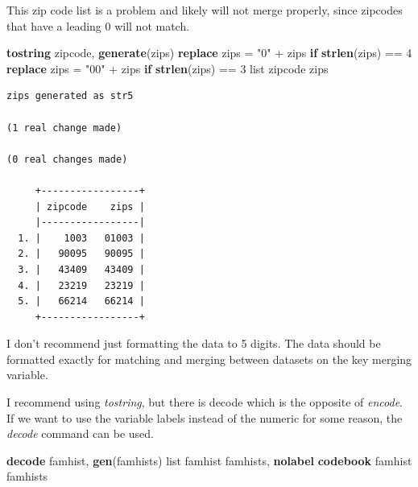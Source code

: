 \documentclass[
]{book}
\newenvironment{Shaded}{\begin{snugshade}}{\end{snugshade}}
\newcommand{\FunctionTok}[1]{\textcolor[rgb]{0.13,0.29,0.53}{\textbf{#1}}}
\newcommand{\KeywordTok}[1]{\textcolor[rgb]{0.13,0.29,0.53}{\textbf{#1}}}
\newcommand{\NormalTok}[1]{#1}
\newcommand{\OtherTok}[1]{\textcolor[rgb]{0.56,0.35,0.01}{#1}}
\newcommand{\StringTok}[1]{\textcolor[rgb]{0.31,0.60,0.02}{#1}}
\begin{document}
This zip code list is a problem and likely will not merge properly, since zipcodes that have a leading 0 will not match.

\begin{Shaded}
\begin{Highlighting}[]
\KeywordTok{tostring}\NormalTok{ zipcode, }\KeywordTok{generate}\NormalTok{(zips)}
\KeywordTok{replace}\NormalTok{ zips = }\StringTok{"0"}\NormalTok{ + zips }\KeywordTok{if} \FunctionTok{strlen}\NormalTok{(zips) == 4}
\KeywordTok{replace}\NormalTok{ zips = }\StringTok{"00"}\NormalTok{ + zips }\KeywordTok{if} \FunctionTok{strlen}\NormalTok{(zips) == 3}
\OtherTok{list}\NormalTok{ zipcode zips}
\end{Highlighting}
\end{Shaded}

\begin{verbatim}
zips generated as str5

(1 real change made)

(0 real changes made)

     +-----------------+
     | zipcode    zips |
     |-----------------|
  1. |    1003   01003 |
  2. |   90095   90095 |
  3. |   43409   43409 |
  4. |   23219   23219 |
  5. |   66214   66214 |
     +-----------------+
\end{verbatim}

I don't recommend just formatting the data to 5 digits. The data should be formatted exactly for matching and merging between datasets on the key merging variable.

I recommend using \emph{tostring}, but there is decode which is the opposite of \emph{encode}. If we want to use the variable labels instead of the numeric for some reason, the \emph{decode} command can be used.

\begin{Shaded}
\begin{Highlighting}[]
\KeywordTok{decode}\NormalTok{ famhist, }\KeywordTok{gen}\NormalTok{(famhists)}
\OtherTok{list}\NormalTok{ famhist famhists, }\KeywordTok{nolabel}
\KeywordTok{codebook}\NormalTok{ famhist famhists}
\end{Highlighting}
\end{Shaded}
\end{document}
